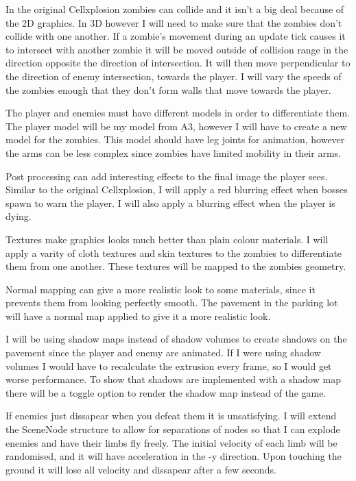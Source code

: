 \documentclass {article}
\begin{document}
\begin{description}
In the original Cellxplosion zombies can collide and it isn't a big deal because of the 2D graphics. In 3D however I will need to make sure that the zombies don't collide with one another.
If a zombie's movement during an update tick causes it to intersect with another zombie it will be moved outside of collision range in the direction opposite the direction of intersection.
It will then move perpendicular to the direction of enemy intersection, towards the player.
I will vary the speeds of the zombies enough that they don't form walls that move towards the player.

The player and enemies must have different models in order to differentiate them.
The player model will be my model from A3, however I will have to create a new model for the zombies. This model should have leg joints for animation, however the arms can be less complex since zombies have limited mobility in their arms.

Post processing can add interesting effects to the final image the player sees.
Similar to the original Cellxplosion, I will apply a red blurring effect when bosses spawn to warn the player. I will also apply a blurring effect when the player is dying.

Textures make graphics looks much better than plain colour materials.
I will apply a varity of cloth textures and skin textures to the zombies to differentiate them from one another. These textures will be mapped to the zombies geometry.

Normal mapping can give a more realistic look to some materials, since it prevents them from looking perfectly smooth. The pavement in the parking lot will have a normal map applied to give it a more realistic look.

I will be using shadow maps instead of shadow volumes to create shadows on the pavement since the player and enemy are animated.
If I were using shadow volumes I would have to recalculate the extrusion every frame, so I would get worse performance.
To show that shadows are implemented with a shadow map there will be a toggle option to render the shadow map instead of the game.

If enemies just dissapear when you defeat them it is unsatisfying.
I will extend the SceneNode structure to allow for separations of nodes so that I can explode enemies and have their limbs fly freely.
The initial velocity of each limb will be randomised, and it will have acceleration in the -y direction.
Upon touching the ground it will lose all velocity and dissapear after a few seconds.


\end{description}
\end{document}
